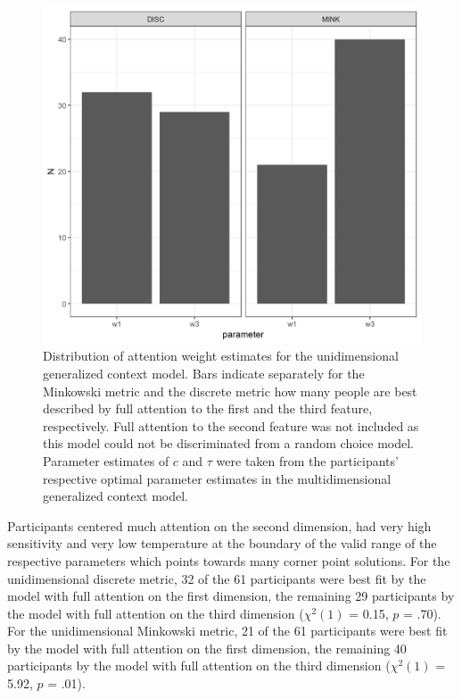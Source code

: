 \documentclass[a4paper,man,natbib]{apa6}
\begin{document}
\begin{figure}
\centering
\includegraphics[width = \textwidth]{fig_par_unidim.png}
\caption{Distribution of attention weight estimates for the unidimensional generalized context model. Bars indicate separately for the Minkowski metric and the discrete metric how many people are best described by full attention to the first and the third feature, respectively. Full attention to the second feature was not included as this model could not be discriminated from a random choice model. Parameter estimates of $c$ and $\tau$ were taken from the participants' respective optimal parameter estimates in the multidimensional generalized context model.}
\label{fig:par_unidim}
\end{figure}

Participants centered much attention on the second dimension, had very high sensitivity and very low temperature at the boundary of the valid range of the respective parameters which points towards many corner point solutions. For the unidimensional discrete metric, 32 of the 61 participants were best fit by the model with full attention on the first dimension, the remaining 29 participants by the model with full attention on the third dimension ($\chi^{2}(1)$ = 0.15, $p$ = .70). For the unidimensional Minkowski metric, 21 of the 61 participants were best fit by the model with full attention on the first dimension, the remaining 40 participants by the model with full attention on the third dimension ($\chi^{2}(1)$ = 5.92, $p$ = .01).
\end{document}
